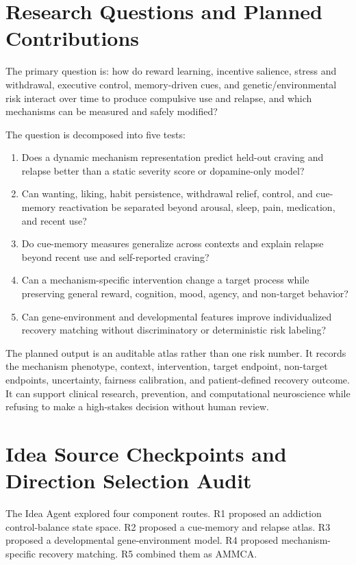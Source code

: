 \documentclass[conference]{IEEEtran}
\begin{document}
\section{Research Questions and Planned Contributions}
The primary question is: how do reward learning, incentive salience, stress and withdrawal, executive control, memory-driven cues, and genetic/environmental risk interact over time to produce compulsive use and relapse, and which mechanisms can be measured and safely modified?

The question is decomposed into five tests:
\begin{enumerate}
\item Does a dynamic mechanism representation predict held-out craving and relapse better than a static severity score or dopamine-only model?
\item Can wanting, liking, habit persistence, withdrawal relief, control, and cue-memory reactivation be separated beyond arousal, sleep, pain, medication, and recent use?
\item Do cue-memory measures generalize across contexts and explain relapse beyond recent use and self-reported craving?
\item Can a mechanism-specific intervention change a target process while preserving general reward, cognition, mood, agency, and non-target behavior?
\item Can gene-environment and developmental features improve individualized recovery matching without discriminatory or deterministic risk labeling?
\end{enumerate}

The planned output is an auditable atlas rather than one risk number. It records the mechanism phenotype, context, intervention, target endpoint, non-target endpoints, uncertainty, fairness calibration, and patient-defined recovery outcome. It can support clinical research, prevention, and computational neuroscience while refusing to make a high-stakes decision without human review.

\section{Idea Source Checkpoints and Direction Selection Audit}
The Idea Agent explored four component routes. R1 proposed an addiction control-balance state space. R2 proposed a cue-memory and relapse atlas. R3 proposed a developmental gene-environment model. R4 proposed mechanism-specific recovery matching. R5 combined them as AMMCA.
\end{document}
